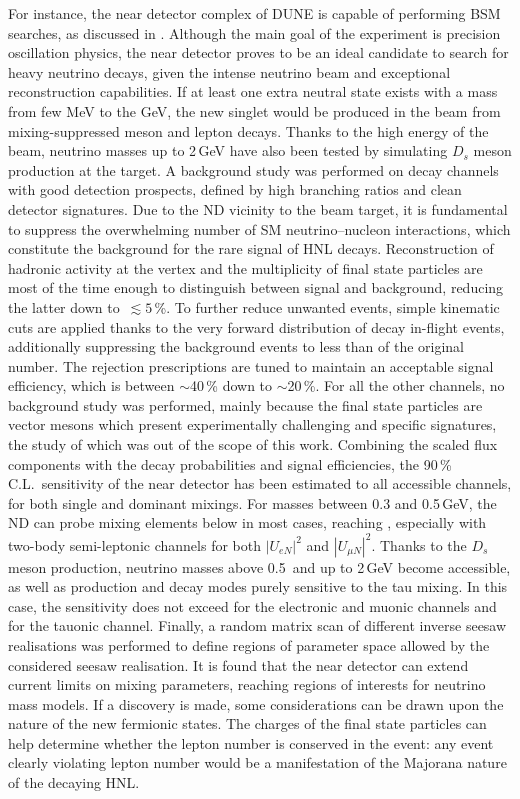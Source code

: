 For instance, the near detector complex of DUNE is capable of performing BSM searches, %
as discussed in .
Although the main goal of the experiment is precision oscillation physics, %
the near detector proves to be an ideal candidate to search for heavy neutrino decays, %
given the intense neutrino beam and exceptional reconstruction capabilities.
If at least one extra neutral state exists with a mass from few MeV to the GeV, %
the new singlet would be produced in the beam from mixing-suppressed meson and lepton decays.
Thanks to the high energy of the beam, neutrino masses up to 2\,GeV have also been tested %
by simulating $D_s$ meson production at the target.
A background study was performed on decay channels with good detection prospects, %
defined by high branching ratios and clean detector signatures.
Due to the ND vicinity to the beam target, it is fundamental to suppress the overwhelming %
number of SM neutrino--nucleon interactions, which constitute the background for the rare signal of HNL decays.
Reconstruction of hadronic activity at the vertex and the multiplicity of final state particles are %
most of the time enough to distinguish between signal and background, reducing the latter down to~$\lesssim5$\,\%.
To further reduce unwanted events, simple kinematic cuts are applied thanks to the very forward distribution of %
decay in-flight events, additionally suppressing the background events to less than  of the original number.
The rejection prescriptions are tuned to maintain an acceptable signal efficiency, which is between $\sim$40\,\% down to $\sim$20\,\%.
For all the other channels, no background study was performed, mainly because the final state particles %
are vector mesons which present experimentally challenging and specific signatures, the study of which %
was out of the scope of this work.
Combining the scaled flux components with the decay probabilities and signal efficiencies, %
the 90\,\% C.L.\ sensitivity of the near detector has been estimated to all accessible channels, %
for both single and dominant mixings.
For masses between 0.3 and 0.5\,GeV, the ND can probe mixing elements below  in most cases, %
reaching , especially with two-body semi-leptonic channels for both $|U_{e N}|^2$ and $|U_{\mu N}|^2$.
Thanks to the $D_s$ meson production, neutrino masses above 0.5\, and up to 2\,GeV become accessible, %
as well as production and decay modes purely sensitive to the tau mixing.
In this case, the sensitivity does not exceed  for the electronic and muonic channels and %
 for the tauonic channel.
Finally, a random matrix scan of different inverse seesaw realisations was performed %
to define regions of parameter space allowed by the considered seesaw realisation.
It is found that the near detector can extend current limits on mixing parameters, %
reaching regions of interests for neutrino mass models.
If a discovery is made, some considerations can be drawn upon the nature of the new fermionic states.
The charges of the final state particles can help determine whether the lepton number %
is conserved in the event: any event clearly violating lepton number would be a manifestation of %
the Majorana nature of the decaying HNL.


